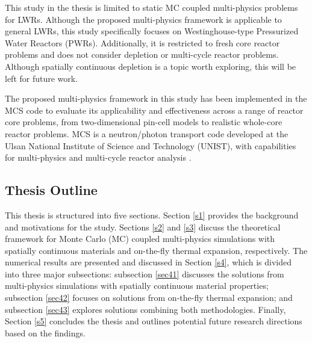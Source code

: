 This study in the thesis is limited to static MC coupled multi-physics problems for LWRs. Although the proposed multi-physics framework is applicable to general LWRs, this study specifically focuses on Westinghouse-type Pressurized Water Reactors (PWRs). Additionally, it is restricted to fresh core reactor problems and does not consider depletion or multi-cycle reactor problems. Although spatially continuous depletion is a topic worth exploring, this will be left for future work.

The proposed multi-physics framework in this study has been implemented in the MCS code \cite{hlee_2020} to evaluate its applicability and effectiveness across a range of reactor core problems, from two-dimensional pin-cell models to realistic whole-core reactor problems. MCS is a neutron/photon transport code developed at the Ulsan National Institute of Science and Technology (UNIST), with capabilities for multi-physics and multi-cycle reactor analysis \cite{hlee_2017, yu_2019, yu_2020}.

\subsection{Thesis Outline}

This thesis is structured into five sections. Section \ref{s1} provides the background and motivations for the study. Sections \ref{s2} and \ref{s3} discuss the theoretical framework for Monte Carlo (MC) coupled multi-physics simulations with spatially continuous materials and on-the-fly thermal expansion, respectively. The numerical results are presented and discussed in Section \ref{s4}, which is divided into three major subsections: subsection \ref{sec41} discusses the solutions from multi-physics simulations with spatially continuous material properties; subsection \ref{sec42} focuses on solutions from on-the-fly thermal expansion; and subsection \ref{sec43} explores solutions combining both methodologies. Finally, Section \ref{s5} concludes the thesis and outlines potential future research directions based on the findings.